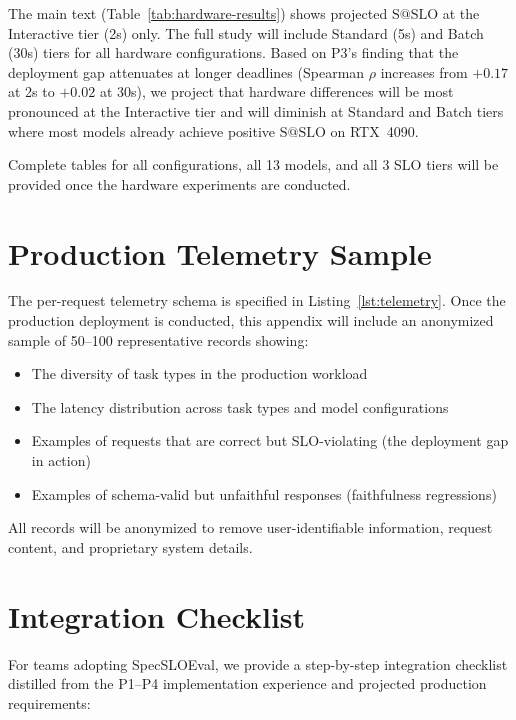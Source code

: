 \documentclass[11pt]{article}
\makeatletter
\newcommand{\sslo}{\ensuremath{\mathrm{S@SLO}}}
\makeatother
\begin{document}
The main text (Table~\ref{tab:hardware-results}) shows projected $\sslo{}$ at the Interactive tier (2s) only. The full study will include Standard (5s) and Batch (30s) tiers for all hardware configurations. Based on P3's finding that the deployment gap attenuates at longer deadlines (Spearman $\rho$ increases from $+0.17$ at 2s to $+0.02$ at 30s), we project that hardware differences will be most pronounced at the Interactive tier and will diminish at Standard and Batch tiers where most models already achieve positive $\sslo{}$ on RTX~4090.

Complete tables for all configurations, all 13 models, and all 3 SLO tiers will be provided once the hardware experiments are conducted.

\section{Production Telemetry Sample}
\label{app:telemetry}

The per-request telemetry schema is specified in Listing~\ref{lst:telemetry}. Once the production deployment is conducted, this appendix will include an anonymized sample of 50--100 representative records showing:

\begin{itemize}[leftmargin=16pt]
    \item The diversity of task types in the production workload
    \item The latency distribution across task types and model configurations
    \item Examples of requests that are correct but SLO-violating (the deployment gap in action)
    \item Examples of schema-valid but unfaithful responses (faithfulness regressions)
\end{itemize}

All records will be anonymized to remove user-identifiable information, request content, and proprietary system details.

\section{Integration Checklist}
\label{app:checklist}

For teams adopting SpecSLOEval, we provide a step-by-step integration checklist distilled from the P1--P4 implementation experience and projected production requirements:
\end{document}
